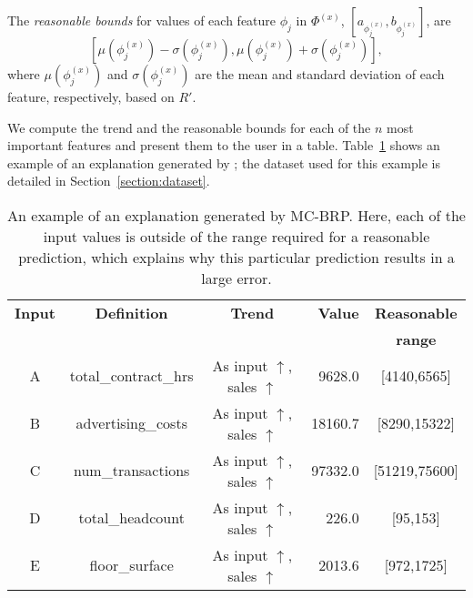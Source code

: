\begin{definition}\rm
The \emph{reasonable bounds} for values of each feature $\phi_j$ in $\Phi^{(x)}$, $[a_{\phi_j^{(x)}}, b_{\phi_j^{(x)}}]$, are 
\[
\left[\mu(\phi_j^{(x)})  - \sigma(\phi_j^{(x)}),    \mu(\phi_j^{(x)})  + \sigma(\phi_j^{(x)})\right],
\]
where $\mu(\phi_j^{(x)})$ and $\sigma(\phi_j^{(x)})$ are the mean and standard deviation of each feature, respectively, based on $R'$. 
\end{definition}

We compute the trend and the reasonable bounds for each of the $n$ most important features and present them to the user in a table. 
Table~\ref{table:example} shows an example of an explanation generated by \OurMethod{}; the dataset used for this example is detailed in Section~\ref{section:dataset}.


\begin{table}
\caption{An example of an explanation generated by MC-BRP. Here, each of the input values is outside of the range required for a reasonable prediction, which explains why this particular prediction results in a large error. }
\label{table:example}
\begin{tabular}{cccrc}
\toprule
\bf Input & \bf Definition & \bf Trend & \bf Value & \bf Reasonable\\
\bf  & \bf  & \bf  & \bf  & \bf  range\\
\midrule
A & total\_contract\_hrs & As input $\uparrow$, sales $\uparrow$
 & 9628.0 & [4140,6565] \\
B & advertising\_costs &  As input $\uparrow$, sales $\uparrow$
 & 18160.7 & \phantom{0}[8290,15322] \\
C & num\_transactions & As input $\uparrow$, sales $\uparrow$
 & 97332.0 & [51219,75600] \\
D & total\_headcount & As input $\uparrow$, sales $\uparrow$
 & 226.0 & \phantom{0}[95,153] \\
E & floor\_surface & As input $\uparrow$, sales $\uparrow$
 & 2013.6 & \phantom{0}[972,1725] \\  
\bottomrule
\end{tabular}
\end{table}


